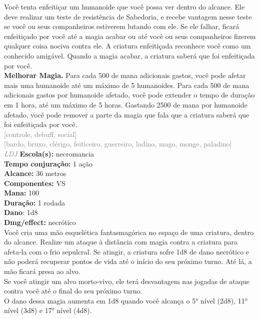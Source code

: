 \documentclass{RPG_Adventure}[2021/10/20]
\begin{document}
{\normalsize Você tenta enfeitiçar um humanoide que você possa ver dentro do alcance. Ele deve realizar um teste de resistência de Sabedoria, e recebe vantagem nesse teste se você ou seus companheiros estiverem lutando com ele.  Se ele falhar, ficará enfeitiçado por você até a magia acabar ou até você ou seus companheiros fizerem qualquer coisa nociva contra ele. A criatura enfeitiçada reconhece você como um conhecido amigável. Quando a magia acabar, a criatura saberá que foi enfeitiçada por você.\\\t \textbf{Melhorar Magia.} Para cada 500 de mana adicionais gastos, você pode afetar mais uma humanoide até um máximo de 5 humanoides. Para cada 500 de mana adicionais gastos por humanoide afetado, você pode extender o tempo de duração em 1 hora, até um máximo de 5 horas. Gastando 2500 de mana por humanoide afetado, você pode remover a parte da magia que fala que a criatura saberá que foi enfeitiçada por você.\\}
{\scriptsize \textcolor{gray}{[controle, debuff, social]\\}}
{\scriptsize \textcolor{gray}{[bardo, bruxo, clérigo, feiticeiro, guerreiro, ladino, mago, monge, paladino]\\}}
{\tiny \textcolor{gray}{\textit{LDJ}}}
{\small \t \textbf{Escola(s):} necromancia\\\t \textbf{Tempo conjuração:} 1 ação\\\t \textbf{Alcance:} 36 metros\\\t \textbf{Componentes:} VS\\\t \textbf{Mana:} 100\\\t \textbf{Duração:} 1 rodada\\\t \textbf{Dano}: 1d8\\\t \textbf{Dmg/effect:} necrótico\\}
{\normalsize Você cria uma mão esquelética fantasmagórica no espaço de uma criatura, dentro do alcance. Realize um ataque à distância com magia contra a criatura para afeta-la com o frio sepulcral. Se atingir, a criatura sofre 1d8 de dano necrótico e não poderá recuperar pontos de vida até o início do seu próximo turno. Até lá, a mão ficará presa ao alvo.\\Se você atingir um alvo morto-vivo, ele terá desvantagem nas jogadas de ataque contra você até o final do seu próximo turno.\\O dano dessa magia aumenta em 1d8 quando você alcança o 5° nível (2d8), 11° nível (3d8) e 17° nível (4d8).\\}
\end{document}
